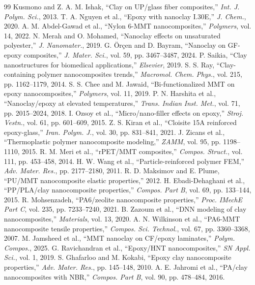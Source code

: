 \documentclass[conference]{IEEEtran}
\begin{document}
\begin{thebibliography}{99}
 Kusmono and Z. A. M. Ishak, ``Clay on UP/glass fiber composites,'' \emph{Int. J. Polym. Sci.}, 2013.
 T. A. Nguyen et al., ``Epoxy with nanoclay I.30E,'' \emph{J. Chem.}, 2020.
 A. M. Abdel-Gawad et al., ``Nylon 6-MMT nanocomposites,'' \emph{Polymers}, vol. 14, 2022.
 N. Merah and O. Mohamed, ``Nanoclay effects on unsaturated polyester,'' \emph{J. Nanomater.}, 2019.
 G. \"{O}r\c{c}en and D. Bayram, ``Nanoclay on GF-epoxy composites,'' \emph{J. Mater. Sci.}, vol. 59, pp. 3467--3487, 2024.
 P. Saikia, ``Clay nanostructures for biomedical applications,'' \emph{Elsevier}, 2019.
 S. S. Ray, ``Clay-containing polymer nanocomposites trends,'' \emph{Macromol. Chem. Phys.}, vol. 215, pp. 1162--1179, 2014.
 S. S. Chee and M. Jawaid, ``Bi-functionalized MMT on epoxy nanocomposites,'' \emph{Polymers}, vol. 11, 2019.
 P. N. Harshita et al., ``Nanoclay/epoxy at elevated temperatures,'' \emph{Trans. Indian Inst. Met.}, vol. 71, pp. 2015--2024, 2018.
 I. Ozsoy et al., ``Micro/nano-filler effects on epoxy,'' \emph{Stroj. Vestn.}, vol. 61, pp. 601--609, 2015.
 Z. S. Kiran et al., ``Cloisite 15A reinforced epoxy-glass,'' \emph{Iran. Polym. J.}, vol. 30, pp. 831--841, 2021.
 J. Zicans et al., ``Thermoplastic polymer nanocomposite modeling,'' \emph{ZAMM}, vol. 95, pp. 1198--1110, 2015.
 R. M. Meri et al., ``rPET/MMT composites,'' \emph{Compos. Struct.}, vol. 111, pp. 453--458, 2014.
 H. W. Wang et al., ``Particle-reinforced polymer FEM,'' \emph{Adv. Mater. Res.}, pp. 2177--2180, 2011.
 R. D. Maksimov and E. Plume, ``PU/MMT nanocomposite elastic properties,'' 2012.
 H. Ebadi-Dehaghani et al., ``PP/PLA/clay nanocomposite properties,'' \emph{Compos. Part B}, vol. 69, pp. 133--144, 2015.
 R. Mohsenzadeh, ``PA6/zeolite nanocomposite properties,'' \emph{Proc. IMechE Part C}, vol. 235, pp. 7233--7240, 2021.
 B. Zazoum et al., ``DNN modeling of clay nanocomposites,'' \emph{Materials}, vol. 13, 2020.
 A. N. Wilkinson et al., ``PA6-MMT nanocomposite tensile properties,'' \emph{Compos. Sci. Technol.}, vol. 67, pp. 3360--3368, 2007.
 M. Jamsheed et al., ``MMT nanoclay on CF/epoxy laminates,'' \emph{Polym. Compos.}, 2025.
 G. Ravichandran et al., ``Epoxy/HNT nanocomposites,'' \emph{SN Appl. Sci.}, vol. 1, 2019.
 S. Ghafarloo and M. Kokabi, ``Epoxy clay nanocomposite properties,'' \emph{Adv. Mater. Res.}, pp. 145--148, 2010.
 A. E. Jahromi et al., ``PA/clay nanocomposites with NBR,'' \emph{Compos. Part B}, vol. 90, pp. 478--484, 2016.

\end{thebibliography}
\end{document}
